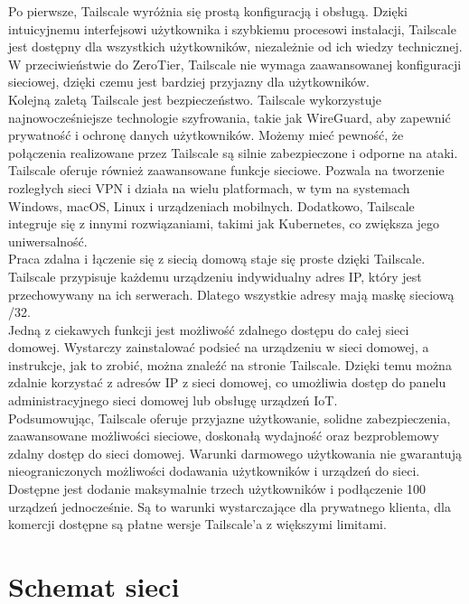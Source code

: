 \documentclass{article}
\begin{document}
Po pierwsze, Tailscale wyróżnia się prostą konfiguracją i obsługą. Dzięki intuicyjnemu interfejsowi użytkownika i szybkiemu procesowi instalacji, Tailscale jest dostępny dla wszystkich użytkowników, niezależnie od ich wiedzy technicznej. W przeciwieństwie do ZeroTier, Tailscale nie wymaga zaawansowanej konfiguracji sieciowej, dzięki czemu jest bardziej przyjazny dla użytkowników.\\

Kolejną zaletą Tailscale jest bezpieczeństwo. Tailscale wykorzystuje najnowocześniejsze technologie szyfrowania, takie jak WireGuard, aby zapewnić prywatność i ochronę danych użytkowników. Możemy mieć pewność, że połączenia realizowane przez Tailscale są silnie zabezpieczone i odporne na ataki.\\

Tailscale oferuje również zaawansowane funkcje sieciowe. Pozwala na tworzenie rozległych sieci VPN i działa na wielu platformach, w tym na systemach Windows, macOS, Linux i urządzeniach mobilnych. Dodatkowo, Tailscale integruje się z innymi rozwiązaniami, takimi jak Kubernetes, co zwiększa jego uniwersalność.\\

Praca zdalna i łączenie się z siecią domową staje się proste dzięki Tailscale. Tailscale przypisuje każdemu urządzeniu indywidualny adres IP, który jest przechowywany na ich serwerach. Dlatego wszystkie adresy mają maskę sieciową /32.\\

Jedną z ciekawych funkcji jest możliwość zdalnego dostępu do całej sieci domowej. Wystarczy zainstalować podsieć na urządzeniu w sieci domowej, a instrukcje, jak to zrobić, można znaleźć na stronie Tailscale. Dzięki temu można zdalnie korzystać z adresów IP z sieci domowej, co umożliwia dostęp do panelu administracyjnego sieci domowej lub obsługę urządzeń IoT.\\

Podsumowując, Tailscale oferuje przyjazne użytkowanie, solidne zabezpieczenia, zaawansowane możliwości sieciowe, doskonałą wydajność oraz bezproblemowy zdalny dostęp do sieci domowej. Warunki darmowego użytkowania nie gwarantują nieograniczonych możliwości dodawania użytkowników i urządzeń do sieci. Dostępne jest dodanie maksymalnie trzech użytkowników i podłączenie 100 urządzeń jednocześnie. Są to warunki wystarczające dla prywatnego klienta, dla komercji dostępne są płatne wersje Tailscale’a z większymi limitami.\cite{tailscale}


\section{Schemat sieci}
\end{document}

